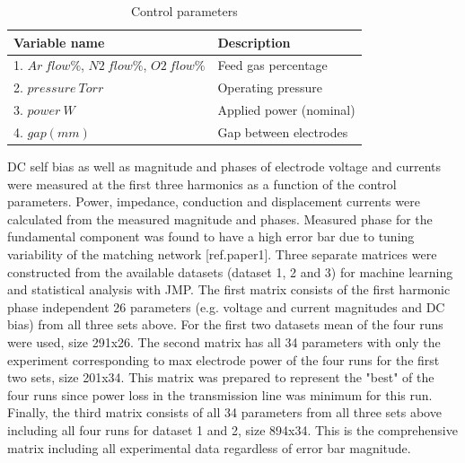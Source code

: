 \documentclass[12pt]{iopart}
\begin{document}
\begin{table}[]
    \centering
\begin{tabular}{|p{7cm}|p{7cm}|}
        \hline
        Variable name & Description\\ 
        \hline
    1. $Ar\ flow\%$, $N2\ flow\%$, $O2\ flow\%$ & Feed gas percentage \\
    2. $pressure\ Torr$ & Operating pressure\\
    3. $power\ W$ & Applied power (nominal)\\
    4. $gap(mm)$ & Gap between electrodes\\ 
       \hline
           \end{tabular}
    \caption{Control parameters}
    \label{tab:Control_parameters}
\end{table}

DC self bias as well as magnitude and phases of electrode voltage and currents were measured at the first three harmonics as a function of the control parameters. Power, impedance, conduction and displacement currents were calculated from the measured magnitude and phases. Measured phase for the fundamental component was found to have a high error bar due to tuning variability of the matching network [ref.paper1]. Three separate matrices were constructed from the available datasets (dataset 1, 2 and 3) for machine learning and statistical analysis with JMP. The first matrix consists of the first harmonic phase independent 26 parameters (e.g. voltage and current magnitudes and DC bias) from all three sets above. For the first two datasets mean of the four runs were used, size 291x26. The second matrix has all 34 parameters with only the experiment corresponding to max electrode power of the four runs for the first two sets, size 201x34. This matrix was prepared to represent the "best" of the four runs since power loss in the transmission line was minimum for this run. Finally, the third matrix consists of all 34 parameters from all three sets above including all four runs for dataset 1 and 2, size 894x34. This is the comprehensive matrix including all experimental data regardless of error bar magnitude.
\end{document}
